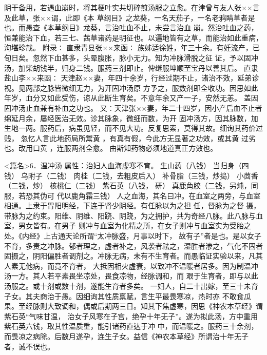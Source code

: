 \documentclass[a4paper,12pt,UTF8,twoside]{ctexbook}
\begin{document}
阴干备用，若遇血崩时，将其梗叶实共切碎煎汤服之立愈。在津曾与友人张××言及此草，张××谓，此即《本 
草纲目》之龙葵，一名天茄子，一名老鸦睛草者是也。而愚查《本草纲目》龙葵，言治吐血不止，未尝言治血 
崩。然治吐血之药，恒兼能治下血，若三七、茜草诸药是明征也。以遍地皆有之草，而能治如此重病，洵堪珍哉。 
附录∶ 
直隶青县张××来函∶ 
族姊适徐姓，年三十余。有妊流产，已旬日矣。忽然下血甚多，头晕腹胀，脉小无力。知为冲脉滑脱之征 
证，予以固冲汤，加柴胡钱半，归身二钱。服药三剂即止。俾继服坤顺至宝丹以善其后。 
直隶盐山李××来函∶ 
天津赵××妻，年四十余岁，行经过期不止，诸治不效，延弟诊视。见两部之脉皆微细无力，为开固冲汤原 
方予之，服数剂即全收功。因思如此年岁，血分又如此受伤，谅从此断生育矣。不意年余又产一子，安然无恙。 
盖因固冲汤止血兼有补血之功也。 
又∶天津张××妻，年二十四岁，因小产后血不止者绵延月余，屡经医治无效。诊其脉象，微细而数，为开 
固冲汤方，因其脉数，加生地一两。服药后，病虽见轻，而不见大功。反复思索，莫得其故。细询其药价过贱， 
忽忆人言此地药局所鬻黄 ，有真有假，今此方无显著之功效，或其黄 过劣也。改用口黄 ，连服两剂全愈。 
由斯知药物必须地道真正方效也。 


<篇名>6．温冲汤
属性：治妇人血海虚寒不育。 
生山药（八钱） 当归身（四钱） 乌附子（二钱） 肉桂（二钱，去粗皮后入） 补骨脂（三钱，炒捣） 
小茴香（二钱，炒） 核桃仁（二钱） 紫石英（八钱， 研） 真鹿角胶（二钱，另炖，同服，若恐其伪可 
代以鹿角霜三钱） 
人之血海，其名曰冲。在血室之两旁，与血室相通。上隶于胃阳明经，下连于肾少阴经。有任脉以为之担 
任，督脉为之督 
摄，带脉为之约束。阳维、阴维、阳跷、阴跷，为之拥护，共为奇经八脉。此八脉与血室，男女皆有。在男子 
则冲与血室为化精之所，在女子则冲与血室实为受胎之处。《内经》上古通天论所谓“太冲脉盛，月事以时下， 
故有子”者是也。是以女子不育，多责之冲脉。郁者理之，虚者补之，风袭者祛之，湿胜者渗之，气化不固者 
固摄之，阴阳偏胜者调剂之。冲脉无病，未有不生育者。而愚临证实验以来，凡其人素无他病，而竟不育者， 
大抵因相火虚衰，以致冲不温暖者居多。因为制温冲汤一方。其人若平素畏坐凉处，畏食凉物，经脉调和，而 
艰于生育者，即与以此汤服之。或十剂或数十剂，遂能生育者多矣。 
一妇人，自二十出嫁，至三十未育子女。其夫商治于愚。因细询其性质禀赋，言生平最畏寒凉，热时亦 
不敢食瓜果。至经脉则大致调和，偶或后期两三日。知其下焦虚寒，因思《神农本草经》谓紫石英“气味甘温， 
治女子风寒在子宫，绝孕十年无子”。遂为拟此汤，方中重用紫石英六钱，取其性温质重，能引诸药直达于冲 
中，而温暖之。服药三十余剂，而畏凉之病除。后数月遂孕，连生子女。益信《神农本草经》所谓治十年无子 
者，诚不误也。 
\end{document}
